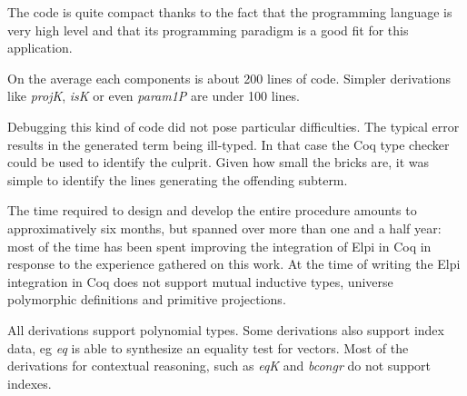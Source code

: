 \documentclass[a4paper,UKenglish,cleveref, autoref]{lipics-v2019}
\newcommand{\derive}[1]{\emph{#1}}
\begin{document}
The code is quite compact thanks to the fact that the programming
language is very high level and that its programming paradigm is a good
fit for this application.

On the average each components is about 200 lines of code.
Simpler derivations like \derive{projK}, \derive{isK} or even
\derive{param1P} are under 100 lines.

Debugging this kind of code did not pose particular difficulties.
The typical error results in the generated term being ill-typed.
In that case the Coq type checker could be used to identify the
culprit. Given how small the bricks are, it was simple to identify
the lines generating the offending subterm.

The time required to design and develop the entire procedure amounts
to approximatively six months, but spanned over more than one and a
half year: most of the time has been spent improving the integration
of Elpi in Coq in response to the experience gathered on this work.
At the time of writing the Elpi integration in Coq does not support
mutual inductive types, universe polymorphic definitions and primitive
projections.

All derivations support polynomial types.
Some derivations also support index data, eg \derive{eq} is able to
synthesize an equality test for vectors. Most of the derivations for
contextual reasoning, such as \derive{eqK} and \derive{bcongr} do not
support indexes.
% 
% 
% 
\end{document}
